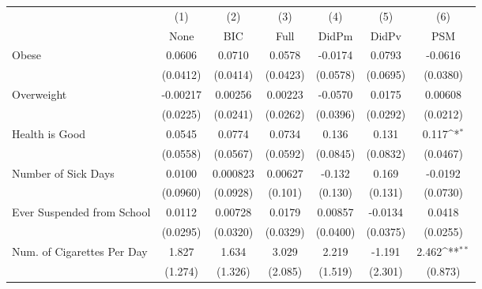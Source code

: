 {
\def\sym#1{\ifmmode^{#1}\else\(^{#1}\)\fi}
\begin{tabular}{l*{6}{c}}
\toprule
            &\multicolumn{1}{c}{(1)}&\multicolumn{1}{c}{(2)}&\multicolumn{1}{c}{(3)}&\multicolumn{1}{c}{(4)}&\multicolumn{1}{c}{(5)}&\multicolumn{1}{c}{(6)}\\
            &\multicolumn{1}{c}{None}&\multicolumn{1}{c}{BIC}&\multicolumn{1}{c}{Full}&\multicolumn{1}{c}{DidPm}&\multicolumn{1}{c}{DidPv}&\multicolumn{1}{c}{PSM}\\
\midrule
Obese       &      0.0606         &      0.0710         &      0.0578         &     -0.0174         &      0.0793         &     -0.0616         \\
            &    (0.0412)         &    (0.0414)         &    (0.0423)         &    (0.0578)         &    (0.0695)         &    (0.0380)         \\
\addlinespace
Overweight  &    -0.00217         &     0.00256         &     0.00223         &     -0.0570         &      0.0175         &     0.00608         \\
            &    (0.0225)         &    (0.0241)         &    (0.0262)         &    (0.0396)         &    (0.0292)         &    (0.0212)         \\
\addlinespace
Health is Good&      0.0545         &      0.0774         &      0.0734         &       0.136         &       0.131         &       0.117\sym{*}  \\
            &    (0.0558)         &    (0.0567)         &    (0.0592)         &    (0.0845)         &    (0.0832)         &    (0.0467)         \\
\addlinespace
Number of Sick Days&      0.0100         &    0.000823         &     0.00627         &      -0.132         &       0.169         &     -0.0192         \\
            &    (0.0960)         &    (0.0928)         &     (0.101)         &     (0.130)         &     (0.131)         &    (0.0730)         \\
\addlinespace
Ever Suspended from School&      0.0112         &     0.00728         &      0.0179         &     0.00857         &     -0.0134         &      0.0418         \\
            &    (0.0295)         &    (0.0320)         &    (0.0329)         &    (0.0400)         &    (0.0375)         &    (0.0255)         \\
\addlinespace
Num. of Cigarettes Per Day&       1.827         &       1.634         &       3.029         &       2.219         &      -1.191         &       2.462\sym{**} \\
            &     (1.274)         &     (1.326)         &     (2.085)         &     (1.519)         &     (2.301)         &     (0.873)         \\
\bottomrule
\end{tabular}
}
